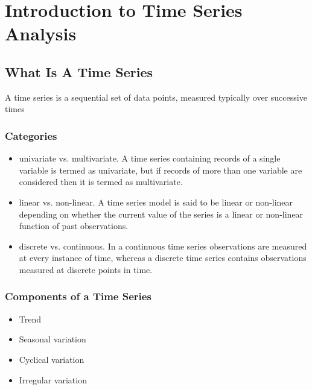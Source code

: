 
\chapter{Introduction to Time Series Analysis} %

\label{Chapter1} %


\newcommand{\keyword}[1]{\textbf{#1}}
\newcommand{\tabhead}[1]{\textbf{#1}}
\newcommand{\code}[1]{\texttt{#1}}
\newcommand{\file}[1]{\texttt{\bfseries#1}}
\newcommand{\option}[1]{\texttt{\itshape#1}}


\section{What Is A Time Series}
A time series is a sequential set of data points, measured typically over successive times
\subsection{Categories}
\begin{itemize}
    \item univariate vs. multivariate. A time series containing records of a single variable is termed as univariate, but if records of more than one variable are considered then it is termed as multivariate.
    \item linear vs. non-linear. A time series model is said to be linear or non-linear depending on whether the current value of the series is a linear or non-linear function of past observations.
    \item discrete vs. continuous. In a continuous time series observations are measured at every instance of time, whereas a discrete time series contains
    observations measured at discrete points in time.
\end{itemize}
\subsection{Components of a Time Series}
\begin{itemize}
    \item Trend
    \item Seasonal variation
    \item Cyclical variation
    \item Irregular variation
\end{itemize}

